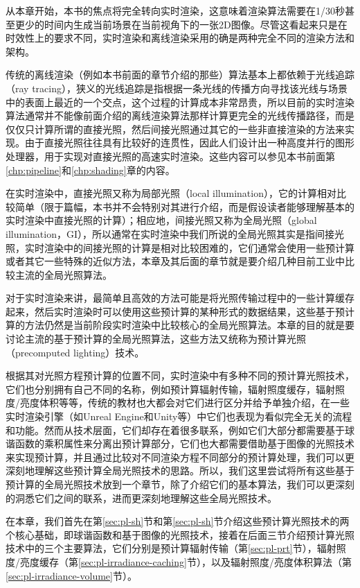 从本章开始，本书的焦点将完全转向实时渲染，这意味着渲染算法需要在1/30秒甚至更少的时间内生成当前场景在当前视角下的一张2D图像。尽管这看起来只是在时效性上的要求不同，实时渲染和离线渲染采用的确是两种完全不同的渲染方法和架构。

传统的离线渲染（例如本书前面的章节介绍的那些）算法基本上都依赖于光线追踪（ray tracing），狭义的光线追踪是指根据一条光线的传播方向寻找该光线与场景中的表面上最近的一个交点，这个过程的计算成本非常昂贵，所以目前的实时渲染算法通常并不能像前面介绍的离线渲染算法那样计算更完全的光线传播路径，而是仅仅只计算所谓的直接光照，然后间接光照通过其它的一些非直接渲染的方法来实现。由于直接光照往往具有比较好的连贯性，因此人们设计出一种高度并行的图形处理器，用于实现对直接光照的高速实时渲染。这些内容可以参见本书前面第\ref{chp:pipeline}和\ref{chp:shading}章的内容。

在实时渲染中，直接光照又称为局部光照（local illumination），它的计算相对比较简单（限于篇幅，本书并不会特别对其进行介绍，而是假设读者能够理解基本的实时渲染中直接光照的计算）；相应地，间接光照又称为全局光照（global illumination，GI），所以通常在实时渲染中我们所说的全局光照其实是指间接光照，实时渲染中的间接光照的计算是相对比较困难的，它们通常会使用一些预计算或者其它一些特殊的近似方法，本章及其后面的章节就是要介绍几种目前工业中比较主流的全局光照算法。

对于实时渲染来讲，最简单且高效的方法可能是将光照传输过程中的一些计算缓存起来，然后实时渲染时可以使用这些预计算的某种形式的数据结果，这些基于预计算的方法仍然是当前阶段实时渲染中比较核心的全局光照算法。本章的目的就是要讨论主流的基于预计算的全局光照算法，这些方法又统称为预计算光照（precomputed lighting）技术。

根据其对光照方程预计算的位置不同，实时渲染中有多种不同的预计算光照技术，它们也分别拥有自己不同的名称，例如预计算辐射传输，辐射照度缓存，辐射照度/亮度体积等等，传统的教材也大都会对它们进行区分并给予单独介绍，在一些实时渲染引擎（如Unreal Engine和Unity等）中它们也表现为看似完全无关的流程和功能。然而从技术层面，它们却存在着很多联系，例如它们大部分都需要基于球谐函数的乘积属性来分离出预计算部分，它们也大都需要借助基于图像的光照技术来实现预计算，并且通过比较对不同渲染方程不同部分的预计算处理，我们可以更深刻地理解这些预计算全局光照技术的思路。所以，我们这里尝试将所有这些基于预计算的全局光照技术放到一个章节，除了介绍它们的基本算法，我们可以更深刻的洞悉它们之间的联系，进而更深刻地理解这些全局光照技术。

在本章，我们首先在第\ref{sec:pl-sh}节和第\ref{sec:pl-sh}节介绍这些预计算光照技术的两个核心基础，即球谐函数和基于图像的光照技术，接着在后面三节介绍预计算光照技术中的三个主要算法，它们分别是预计算辐射传输（第\ref{sec:pl-prt}节），辐射照度/亮度缓存（第\ref{sec:pl-irradiance-caching}节），以及辐射照度/亮度体积算法（第\ref{sec:pl-irradiance-volume}节）。



